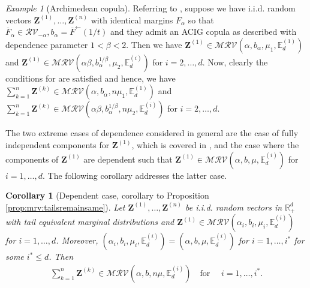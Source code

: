 \documentclass[aos]{imsart}
\numberwithin{equation}{section}
\theoremstyle{plain} %
\newtheorem{corollary}[theorem]{Corollary}
\theoremstyle{remark}
\newtheorem{example}[theorem]{Example}
\newcommand{\beao}{\begin{eqnarray*}}
\newcommand{\eeao}{\end{eqnarray*}\noindent}
\newcommand{\E}{\mathbb{E}}
\newcommand{\R}{\mathbb{R}}
\def\MRV{\mathcal{MRV}}
\def\RV{\mathcal{RV}}
\def\bZ{\boldsymbol Z}
\begin{document}
\begin{example}[Archimedean copula] \label{example:Archimedean}
Referring to , suppose we have  i.i.d.  random vectors $\bZ^{(1)}, \ldots, \bZ^{(n)}$ with identical margins $F_{\alpha}$ so that $\overline{F}_{\alpha}\in \RV_{-\alpha}, b_{\alpha} = \overline{F}^{\leftarrow}(1/t)$ and they admit an ACIG copula as described with dependence parameter $1<\beta<2$. Then we have $\bZ^{(1)}\in \MRV(\alpha,b_{\alpha},\mu_1,\E_d^{(1)})$ and {$\bZ^{(1)}\in\MRV(\alpha\beta,b_{\alpha}^{1/\beta},\mu_2,\E_d^{(i)})$ } for $i=2,\ldots, d$. Now, clearly the conditions for  are satisfied and hence, we have $\sum_{k=1}^n\bZ^{(k)}\in \MRV(\alpha,b_{\alpha},n\mu_1,\E_d^{(1)})$ and {$\sum_{k=1}^n\bZ^{(k)} \in\MRV(\alpha\beta,b_{\alpha}^{1/\beta},n\mu_2,\E_d^{(i)})$ } for $i=2,\ldots, d$.
\end{example}


The two extreme cases of dependence considered in general are the case of fully independent components for $\bZ^{(1)}$, which is covered in , and the case where the components of $\bZ^{(1)}$ are dependent such that $\bZ^{(1)}\in\MRV(\alpha,b,\mu,\E_d^{(i)})$ for $i=1,\ldots,d$. The following corollary addresses the latter case. %

\begin{corollary}[Dependent case, corollary to Proposition \ref{prop:mrv:tailsremainsame}]\label{cor:asymdep}
Let $\bZ^{(1)},\ldots,\bZ^{(n)}$ be  i.i.d.  random vectors in $\R_+^d$ {with tail equivalent marginal distributions }
and \linebreak $\bZ^{(1)}\in\MRV(\alpha_i,b_i,\mu_i,\E_d^{(i)})$  for $i=1,\ldots,d$. Moreover,  $(\alpha_i,b_i,\mu_i,\E_d^{(i)}) = (\alpha,b,\mu,\E_d^{(i)})$ for $i=1,\ldots, i^*$ for some $ i^*\le d$. Then
\beao
                \sum_{k=1}^n\bZ^{(k)}\in\MRV(\alpha,b,n\mu,\E_d^{(i)}) \quad  \text {for } \quad i=1,\ldots,  i^*.
         \eeao
\end{corollary}
\end{document}

